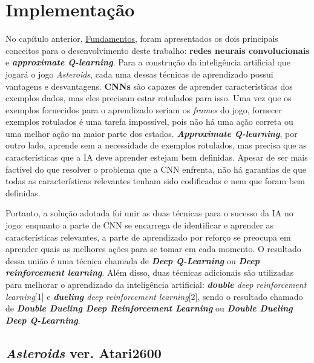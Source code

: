 

\chapter{Implementação}
\label{cap:implementacao}

No capítulo anterior, \hyperref[cap:fundamentos]{Fundamentos}, foram apresentados os dois principais conceitos para o desenvolvimento deste trabalho: \textbf{redes neurais convolucionais} e \textbf{\textit{approximate Q-learning}}.
Para a construção da inteligência artificial que jogará o jogo \textit{Asteroids}, cada uma dessas técnicas de aprendizado possui vantagens e desvantagens.
\textbf{CNNs} são capazes de aprender características dos exemplos dados, mas eles precisam estar rotulados para isso. Uma vez que os exemplos fornecidos para o aprendizado seriam os \textit{frames} do jogo, fornecer exemplos rotulados é uma tarefa impossível, pois não há uma ação correta ou uma melhor ação na maior parte dos estados.
\textbf{\textit{Approximate Q-learning}}, por outro lado, aprende sem a necessidade de exemplos rotulados, mas precisa que as características que a IA deve aprender estejam bem definidas. Apesar de ser mais factível do que resolver o problema que a CNN enfrenta, não há garantias de que todas as características relevantes tenham sido codificadas e nem que foram bem definidas.

Portanto, a solução adotada foi unir as duas técnicas para o sucesso da IA no jogo: enquanto a parte de CNN se encarrega de identificar e aprender as características relevantes, a parte de aprendizado por reforço se preocupa em aprender quais as melhores ações para se tomar em cada momento. O resultado dessa união é uma técnica chamada de \textbf{\textit{Deep Q-Learning}} ou \textbf{\textit{Deep reinforcement learning}}.
Além disso, duas técnicas adicionais são utilizadas para melhorar o aprendizado da inteligência artificial: \textit{\textbf{double} deep reinforcement learning}[1] e \textit{\textbf{dueling} deep reinforcement learning}[2], sendo o resultado chamado de \textit{\textbf{Double Dueling Deep Reinforcement Learning}} ou \textit{\textbf{Double Dueling Deep Q-Learning}}.

\section{\textit{Asteroids} ver. Atari2600}
\label{sec:aa2600}


